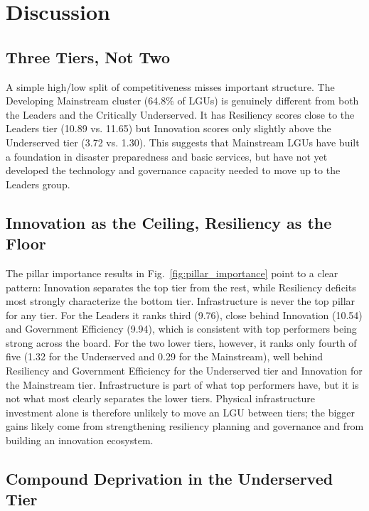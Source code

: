 \documentclass[conference]{IEEEtran}
\begin{document}
\section{Discussion}
\label{sec:discussion}

\subsection{Three Tiers, Not Two}

A simple high/low split of competitiveness misses important structure. The Developing Mainstream cluster (64.8\% of LGUs) is genuinely different from both the Leaders and the Critically Underserved. It has Resiliency scores close to the Leaders tier (10.89 vs. 11.65) but Innovation scores only slightly above the Underserved tier (3.72 vs. 1.30). This suggests that Mainstream LGUs have built a foundation in disaster preparedness and basic services, but have not yet developed the technology and governance capacity needed to move up to the Leaders group.

\subsection{Innovation as the Ceiling, Resiliency as the Floor}

The pillar importance results in Fig.~\ref{fig:pillar_importance} point to a clear pattern: Innovation separates the top tier from the rest, while Resiliency deficits most strongly characterize the bottom tier. Infrastructure is never the top pillar for any tier. For the Leaders it ranks third (9.76), close behind Innovation (10.54) and Government Efficiency (9.94), which is consistent with top performers being strong across the board. For the two lower tiers, however, it ranks only fourth of five (1.32 for the Underserved and 0.29 for the Mainstream), well behind Resiliency and Government Efficiency for the Underserved tier and Innovation for the Mainstream tier. Infrastructure is part of what top performers have, but it is not what most clearly separates the lower tiers. Physical infrastructure investment alone is therefore unlikely to move an LGU between tiers; the bigger gains likely come from strengthening resiliency planning and governance and from building an innovation ecosystem.

\subsection{Compound Deprivation in the Underserved Tier}
\end{document}

